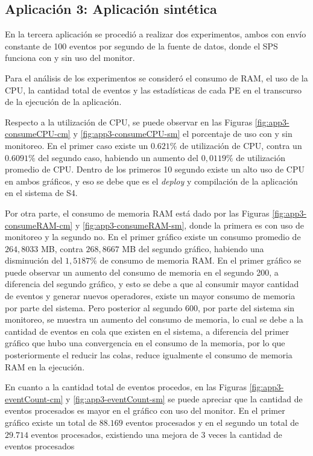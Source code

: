 \subsection{Aplicación 3: Aplicación sintética}
En la tercera aplicación se procedió a realizar dos experimentos, ambos con envío constante de 100 eventos por segundo de la fuente de datos, donde el SPS funciona con y sin uso del monitor.

Para el análisis de los experimentos se consideró el consumo de RAM, el uso de la CPU, la cantidad total de eventos y las estadísticas de cada PE en el transcurso de la ejecución de la aplicación.

Respecto a la utilización de CPU, se puede observar en las Figuras \ref{fig:app3-consumeCPU-cm} y \ref{fig:app3-consumeCPU-sm} el porcentaje de uso con y sin monitoreo. En el primer caso existe un $0.621\%$ de utilización de CPU, contra un $0.6091\%$ del segundo caso, habiendo un aumento del $0,0119\%$ de utilización promedio de CPU. Dentro de los primeros 10 segundo existe un alto uso de CPU en ambos gráficos, y eso se debe que es el \textit{deploy} y compilación de la aplicación en el sistema de S4.

Por otra parte, el consumo de memoria RAM está dado por las Figuras \ref{fig:app3-consumeRAM-cm} y \ref{fig:app3-consumeRAM-sm}, donde la primera es con uso de monitoreo y la segundo no. En el primer gráfico existe un consumo promedio de $264,8033$ MB, contra $268,8667$ MB del segundo gráfico, habiendo una disminución del $1,5187\%$ de consumo de memoria RAM. En el primer gráfico se puede observar un aumento del consumo de memoria en el segundo 200, a diferencia del segundo gráfico, y esto se debe a que al consumir mayor cantidad de eventos y generar nuevos operadores, existe un mayor consumo de memoria por parte del sistema. Pero posterior al segundo 600, por parte del sistema sin monitoreo, se muestra un aumento del consumo de memoria, lo cual se debe a la cantidad de eventos en cola que existen en el sistema, a diferencia del primer gráfico que hubo una convergencia en el consumo de la memoria, por lo que posteriormente el reducir las colas, reduce igualmente el consumo de memoria RAM en la ejecución.

En cuanto a la cantidad total de eventos procedos, en las Figuras \ref{fig:app3-eventCount-cm} y \ref{fig:app3-eventCount-sm} se puede apreciar que la cantidad de eventos procesados es mayor en el gráfico con uso del monitor. En el primer gráfico existe un total de $88.169$ eventos procesados y en el segundo un total de $29.714$ eventos procesados, existiendo una mejora de 3 veces la cantidad de eventos procesados

